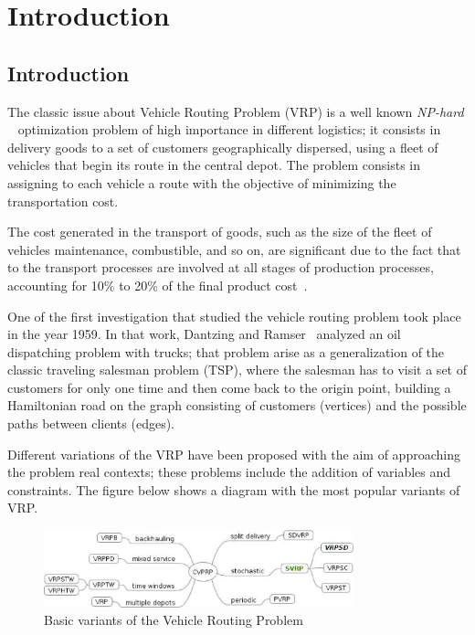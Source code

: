 \chapter{Introduction}
\label{chap:intro}


\section{Introduction}

The classic issue about Vehicle Routing Problem (VRP) is a well known \textit{NP-hard} ~\cite{Lenstra1981} optimization problem of high importance in different logistics; it consists in delivery goods to a set of customers geographically dispersed, using a fleet of vehicles that begin its route in the central depot. The problem consists in assigning to each vehicle a route with the objective of minimizing the transportation cost.

The cost generated in the transport of goods, such as the size of the fleet of vehicles maintenance, combustible, and so on, are significant due to the fact that to the transport processes are involved at all stages of production processes, accounting for 10\% to 20\% of the final product cost~\cite{toth_vehicle_2001}.

One of the first investigation that studied the vehicle routing problem took place in the year 1959. In that work, Dantzing and Ramser~\cite{Dantzing1959} analyzed an oil dispatching problem with trucks; that problem arise as a generalization of the classic traveling salesman problem (TSP), where the salesman has to visit a set of customers for only one time and then come back to the origin point, building a Hamiltonian road on the graph consisting of customers (vertices) and the possible paths between clients (edges).

Different variations of the VRP have been proposed with the aim of approaching the problem real contexts; these problems include the addition of variables and constraints. The figure below shows a diagram with the most popular variants of VRP.

\begin{figure}[!htbp]
  \begin{center}
    \includegraphics[width=0.8\textwidth]{Images/Chapter1/variants_vrp.eps}
  \end{center}
  \caption{Basic variants of the Vehicle Routing Problem}
  \label{fig:VRP_variants}
\end{figure}

